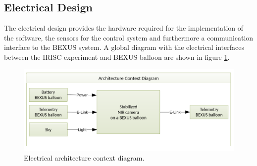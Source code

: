 \pagebreak
\subsection{Electrical Design}
The electrical design provides the hardware required for the implementation of the software, the sensors for the control system and furthermore a communication interface to the BEXUS system. A global diagram with the electrical interfaces between the IRISC experiment and BEXUS balloon are shown in figure \ref{fig:elec-ACD}. %
\vspace{-.5cm}
\begin{figure}[H]
	\centering
	\includegraphics[width=.6\textwidth]{4-experiment-design/img/electrical/ArchitectureContext.png}
	\caption{Electrical architecture context diagram.}
	\label{fig:elec-ACD}
\end{figure}


